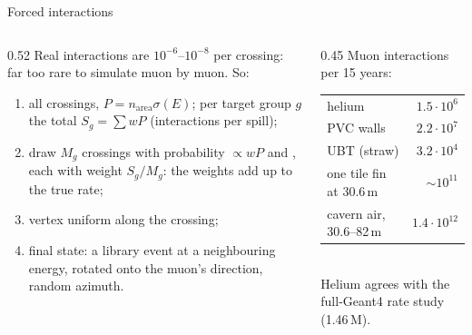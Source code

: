 \documentclass[aspectratio=169,10pt]{beamer}
\begin{document}
\begin{frame}{Forced interactions}
  \begin{columns}[c]
    \begin{column}{0.52\textwidth}\small
      Real interactions are $10^{-6}$--$10^{-8}$ per crossing: far too rare to simulate muon by muon. So:
      \begin{enumerate}\footnotesize
        \item all crossings, $P = n_\mathrm{area}\sigma(E)$; per target group $g$ the total $S_g = \sum wP$ (interactions per spill);
        \item draw $M_g$ crossings with probability $\propto wP$ and , each with weight $S_g/M_g$: the weights add up to the true rate;
        \item vertex uniform along the crossing;
        \item final state: a library event at a neighbouring energy, rotated onto the muon's direction, random azimuth.
      \end{enumerate}
    \end{column}
    \begin{column}{0.45\textwidth}\footnotesize
      Muon interactions per 15 years:\\[1mm]
      \begin{tabular}{@{}lr@{}}
        \toprule
        helium & $1.5\cdot10^{6}$\\
        PVC walls & $2.2\cdot10^{7}$\\
        UBT (straw) & $3.2\cdot10^{4}$\\
        one tile fin at 30.6\,m & $\sim10^{11}$\\
        cavern air, 30.6--82\,m & $1.4\cdot10^{12}$\\
        \bottomrule
      \end{tabular}\\[1.5mm]
      Helium agrees with the full-Geant4 rate study (1.46\,M).\\[1.5mm]
    \end{column}
  \end{columns}
\end{frame}
\end{document}
